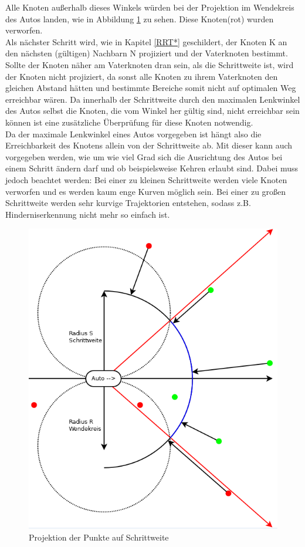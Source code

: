 Alle Knoten außerhalb dieses Winkels würden bei der Projektion im Wendekreis des Autos landen, wie in Abbildung \ref{fig:fig5} zu sehen. Diese Knoten(rot) wurden verworfen.\\
Als nächster Schritt wird, wie in Kapitel \ref{RRT*} geschildert, der Knoten K an den nächsten (gültigen) Nachbarn N projiziert und der Vaterknoten bestimmt. Sollte der Knoten näher am Vaterknoten dran sein, als die Schrittweite ist, wird der Knoten nicht projiziert, da sonst alle Knoten zu ihrem Vaterknoten den gleichen Abstand hätten und bestimmte Bereiche somit nicht auf optimalen Weg erreichbar wären. Da innerhalb der Schrittweite durch den maximalen Lenkwinkel des Autos selbst die Knoten, die vom Winkel her gültig sind, nicht erreichbar sein können ist eine zusätzliche Überprüfung für diese Knoten notwendig. \\
Da der maximale Lenkwinkel eines Autos vorgegeben ist hängt also die Erreichbarkeit des Knotens allein von der Schrittweite ab. Mit dieser kann auch vorgegeben werden, wie um wie viel Grad sich die Ausrichtung des Autos bei einem Schritt ändern darf und ob beispielsweise Kehren erlaubt sind. Dabei muss jedoch beachtet werden: Bei einer zu kleinen Schrittweite werden viele Knoten verworfen und es werden kaum enge Kurven möglich sein. Bei einer zu großen Schrittweite werden sehr kurvige Trajektorien entstehen, sodass z.B. Hinderniserkennung nicht mehr so einfach ist.
\begin{figure}
\centering
\label{fig:fig5}
\includegraphics[scale=0.7]{Bilder/Projektion_der_Punkte.png} 
\caption{Projektion der Punkte auf Schrittweite}
\end{figure}
